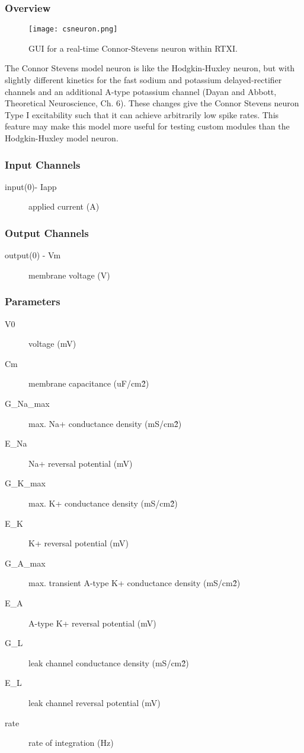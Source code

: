 \subsubsection{Overview}
\label{Connor-Stevens Neuron}
\begin{figure}[h]
\begin{center}
\texttt{[image: csneuron.png]} 
\caption[CS Neuron]{GUI for a real-time Connor-Stevens neuron within RTXI.} 
\end{center}
\label{csneuron}
\end{figure}

The Connor Stevens model neuron is like the Hodgkin-Huxley neuron, but with slightly different kinetics for the fast sodium and potassium delayed-rectifier channels and an additional A-type potassium channel (Dayan and Abbott, Theoretical Neuroscience, Ch. 6). These changes give the Connor Stevens neuron Type I excitability such that it can achieve arbitrarily low spike rates. This feature may make this model more useful for testing custom modules than the Hodgkin-Huxley model neuron.

\subsubsection{Input Channels}
\begin{description}
\item[input(0)- Iapp] applied current (A)
\end{description}

\subsubsection{Output Channels}
\begin{description}
\item[output(0) - Vm] membrane voltage (V)
\end{description}

\subsubsection{Parameters}
\begin{description}
\item[V0] voltage (mV)
\item[Cm] membrane capacitance (uF/cm\^2)
\item[G\_Na\_max] max. Na+ conductance density  (mS/cm\^2)
\item[E\_Na] Na+ reversal potential (mV)
\item[G\_K\_max] max. K+ conductance density (mS/cm\^2)
\item[E\_K] K+ reversal potential (mV)
\item[G\_A\_max] max. transient A-type K+ conductance density (mS/cm\^2)
\item[E\_A] A-type K+ reversal potential (mV) 
\item[G\_L] leak channel conductance density (mS/cm\^2)
\item[E\_L] leak channel reversal potential (mV)
\item[rate] rate of integration (Hz)
\end{description}

